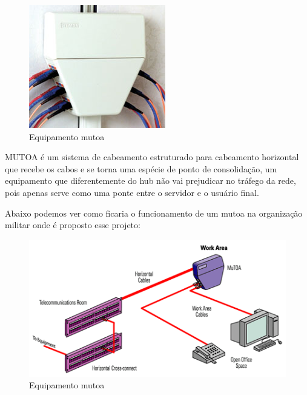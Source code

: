 \documentclass[12pt, a4paper]{article}
\begin{document}
	\FloatBarrier
	\begin{figure}[!htp]
		\centering
		\includegraphics[scale=0.9]{mutoa.jpg}
		\caption{Equipamento mutoa}
	\end{figure}
	\FloatBarrier
	MUTOA é um sistema de cabeamento estruturado para cabeamento horizontal que recebe os cabos e se torna uma espécie de ponto de consolidação, um equipamento que diferentemente do hub não vai prejudicar no tráfego da rede, pois apenas serve como uma ponte entre o servidor e o usuário final.
	\par 
	Abaixo podemos ver como ficaria o funcionamento de um mutoa na organização militar onde é proposto esse projeto:
	\FloatBarrier
	\begin{figure}[!htp]
		\centering
		\includegraphics[scale=0.9]{mutoa2.png}
		\caption{Equipamento mutoa}
	\end{figure}
	\FloatBarrier
	
\end{document}

